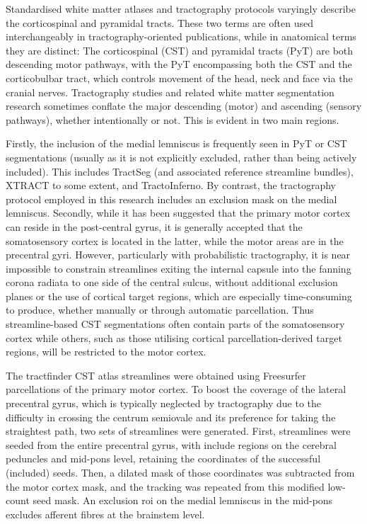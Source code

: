 Standardised white matter atlases and tractography protocols varyingly describe the corticospinal and pyramidal tracts.
These two terms are often used interchangeably in tractography-oriented publications, while in anatomical terms they are distinct:
The corticospinal (CST) and pyramidal tracts (PyT) are both descending motor pathways, with the PyT encompassing both the CST and the corticobulbar tract, which controls movement of the head, neck and face via the cranial nerves.
Tractography studies and related white matter segmentation research sometimes conflate the major descending (motor) and ascending (sensory pathways), whether intentionally or not. 
This is evident in two main regions.

Firstly, the inclusion of the medial lemniscus is frequently seen in PyT or CST segmentations (usually as it is not explicitly excluded, rather than being actively included).
This includes TractSeg (and associated reference streamline bundles), XTRACT to some extent, and TractoInferno.
By contrast, the tractography protocol employed in this research includes an exclusion mask on the medial lemniscus.
Secondly, while it has been suggested that the primary motor cortex can reside in the post-central gyrus,\autocite{Kumar2009} it is generally accepted that the somatosensory cortex is located in the latter, while the motor areas are in the precentral gyri.
However, particularly with probabilistic tractography, it is near impossible to constrain streamlines exiting the internal capsule into the fanning corona radiata to one side of the central sulcus, without additional exclusion planes or the use of cortical target regions, which are especially time-consuming to produce, whether manually or through automatic parcellation.
Thus streamline-based CST segmentations often contain parts of the somatosensory cortex\autocite{Poulin2021} while others, such as those utilising cortical parcellation-derived target regions, will be restricted to the motor cortex.

The tractfinder CST atlas streamlines were obtained using Freesurfer parcellations \autocite{Desikan2006,FischlSalat2002} of the primary motor cortex.
To boost the coverage of the lateral precentral gyrus, which is typically neglected by tractography due to the difficulty in crossing the centrum semiovale and its preference for taking the straightest path, two sets of streamlines were generated.
First, streamlines were seeded from the entire precentral gyrus, with include regions on the cerebral peduncles and mid-pons level, retaining the coordinates of the successful (included) seeds.
Then, a dilated mask of those coordinates was subtracted from the motor cortex mask, and the tracking was repeated from this modified low-count seed mask.
An exclusion \gls{roi} on the medial lemniscus in the mid-pons excludes afferent fibres at the brainstem level.

